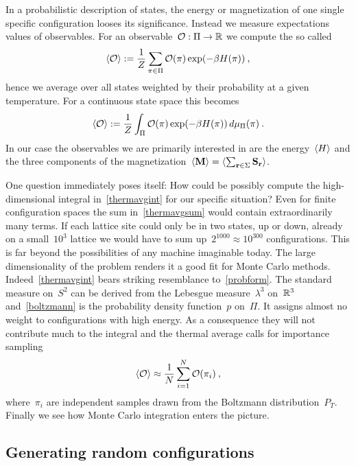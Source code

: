 In a probabilistic description of states, the energy or magnetization of one
single specific configuration looses its significance. Instead we measure
expectations values of observables. For an observable~${\mathcal{O}}:{\Pi}\to{\mathbb{R}}$ we
compute the so called 
%
\begin{equation}\label{thermavgsum}
  \langle \mathcal{O} \rangle := \frac{1}{Z} \sum_{\pi \in \Pi} \mathcal{O}(\pi) \exp(- \beta H(\pi))\:,
\end{equation}
%
hence we average over all states weighted by their probability at a given
temperature. For a continuous state space this becomes
%
\begin{equation}\label{thermavgint}
  \langle \mathcal{O} \rangle := \frac{1}{Z} \int_{\Pi} \mathcal{O}(\pi) \exp(- \beta H(\pi))
    \,d\mu_{\Pi}(\pi)\:.
\end{equation}
%
In our case the observables we are primarily interested in are the
energy~$\langle H \rangle$ and the three components of the magnetization~$\langle \mathbf{M} \rangle =
\langle \sum_{\mathbf{r} \in \Sigma} \mathbf{S}_{\mathbf{r}} \rangle$.

One question immediately poses itself: How could be possibly compute the
high-dimensional integral in~\eqref{thermavgint} for our specific situation?
Even for finite configuration spaces the sum in~\eqref{thermavgsum} would
contain extraordinarily many terms. If each lattice site could only be in two
states, up or down, already on a small~$10^3$ lattice we would have to sum
up~$2^{1000} \approx 10^{300}$ configurations. This is far beyond the
possibilities of any machine imaginable today. The large dimensionality of the
problem renders it a good fit for Monte Carlo methods.
Indeed~\eqref{thermavgint} bears striking resemblance to~\eqref{probform}. The
standard measure on~$S^2$ can be derived from the Lebesgue measure~$\lambda^3$
on~$\mathbb{R}^3$ and~\eqref{boltzmann} is the probability density function~$p$
on~$\Pi$. It assigns almost no weight to configurations with high energy. As a
consequence they will not contribute much to the integral and the thermal
average calls for importance sampling
%
\begin{equation}
  \langle \mathcal{O} \rangle \approx \frac{1}{N} \sum_{i = 1}^N \mathcal{O}(\pi_i)\:,
\end{equation}
%
where~$\pi_i$ are independent samples drawn from the Boltzmann
distribution~$P_T$. Finally we see how Monte Carlo integration enters the
picture.

\subsection{Generating random configurations}

